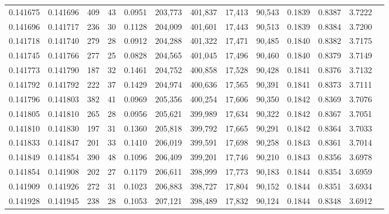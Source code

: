 \begin{tabular}{rrrrrrrrrrrrr}
0.141675 & 0.141696 &   409 &  43 &                                     0.0951 & 203,773 & 401,837 &  17,413 &  90,543 & 0.1839 & 0.8387 & 3.7222 \\
0.141696 & 0.141717 &   236 &  30 &                                     0.1128 & 204,009 & 401,601 &  17,443 &  90,513 & 0.1839 & 0.8384 & 3.7200 \\
0.141718 & 0.141740 &   279 &  28 &                                     0.0912 & 204,288 & 401,322 &  17,471 &  90,485 & 0.1840 & 0.8382 & 3.7175 \\
0.141745 & 0.141766 &   277 &  25 &                                     0.0828 & 204,565 & 401,045 &  17,496 &  90,460 & 0.1840 & 0.8379 & 3.7149 \\
0.141773 & 0.141790 &   187 &  32 &                                     0.1461 & 204,752 & 400,858 &  17,528 &  90,428 & 0.1841 & 0.8376 & 3.7132 \\
0.141792 & 0.141792 &   222 &  37 &                                     0.1429 & 204,974 & 400,636 &  17,565 &  90,391 & 0.1841 & 0.8373 & 3.7111 \\
0.141796 & 0.141803 &   382 &  41 &                                     0.0969 & 205,356 & 400,254 &  17,606 &  90,350 & 0.1842 & 0.8369 & 3.7076 \\
0.141805 & 0.141810 &   265 &  28 &                                     0.0956 & 205,621 & 399,989 &  17,634 &  90,322 & 0.1842 & 0.8367 & 3.7051 \\
0.141810 & 0.141830 &   197 &  31 &                                     0.1360 & 205,818 & 399,792 &  17,665 &  90,291 & 0.1842 & 0.8364 & 3.7033 \\
0.141833 & 0.141847 &   201 &  33 &                                     0.1410 & 206,019 & 399,591 &  17,698 &  90,258 & 0.1843 & 0.8361 & 3.7014 \\
0.141849 & 0.141854 &   390 &  48 &                                     0.1096 & 206,409 & 399,201 &  17,746 &  90,210 & 0.1843 & 0.8356 & 3.6978 \\
0.141854 & 0.141908 &   202 &  27 &                                     0.1179 & 206,611 & 398,999 &  17,773 &  90,183 & 0.1844 & 0.8354 & 3.6959 \\
0.141909 & 0.141926 &   272 &  31 &                                     0.1023 & 206,883 & 398,727 &  17,804 &  90,152 & 0.1844 & 0.8351 & 3.6934 \\
0.141928 & 0.141945 &   238 &  28 &                                     0.1053 & 207,121 & 398,489 &  17,832 &  90,124 & 0.1844 & 0.8348 & 3.6912 \\

\end{tabular}
